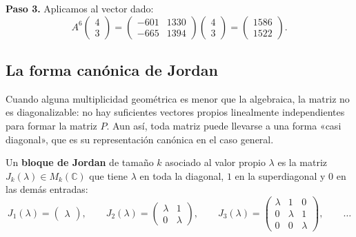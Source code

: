 \begin{example}
\begin{myproof}
\textbf{Paso 3.} Aplicamos al vector dado:
\[
A^6 \begin{pmatrix} 4 \\ 3 \end{pmatrix}
= \begin{pmatrix} -601 & 1330 \\ -665 & 1394 \end{pmatrix} \begin{pmatrix} 4 \\ 3 \end{pmatrix}
= \boxed{\begin{pmatrix} 1586 \\ 1522 \end{pmatrix}}.
\]
\end{myproof}
\end{example}


\subsection{La forma canónica de Jordan}\label{subsec:jordan}

Cuando alguna multiplicidad geométrica es menor que la algebraica, la matriz no es diagonalizable: no hay suficientes vectores propios linealmente independientes para formar la matriz $P$. Aun así, toda matriz puede llevarse a una forma «casi diagonal», que es su representación canónica en el caso general.

\begin{definition}
Un \textbf{bloque de Jordan} de tamaño $k$ asociado al valor propio $\lambda$ es la matriz $J_k(\lambda)\in M_k(\mathbb{C})$ que tiene $\lambda$ en toda la diagonal, $1$ en la superdiagonal y $0$ en las demás entradas:
\[
J_1(\lambda)=\begin{pmatrix}\lambda\end{pmatrix}, \qquad
J_2(\lambda)=\begin{pmatrix}\lambda & 1\\ 0 & \lambda\end{pmatrix}, \qquad
J_3(\lambda)=\begin{pmatrix}\lambda & 1 & 0\\ 0 & \lambda & 1\\ 0 & 0 & \lambda\end{pmatrix}, \qquad \dots
\]
\end{definition}

